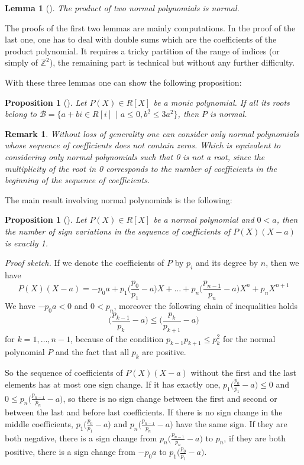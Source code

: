 \documentclass[11pt, a4paper]{article}
\newtheorem{lemma}[mtheorem]{Lemma}
\newtheorem{remark}[mtheorem]{Remark}
\newtheorem{proposition}[mtheorem]{Proposition}
\newcommand{\ssb}{{\mathcal B}}
\newcommand{\zz}{{\mathbb Z}}
\begin{document}
\begin{lemma}[\cite{bpr}]
The product of two  normal polynomials is normal.
\label{lemma243}
\end{lemma}

The proofs of the first two lemmas are mainly computations. In the proof of the last one, one has to deal with double sums which are the coefficients of the product polynomial. It requires a tricky partition of the range of indices (or simply of $\zz^2$), the remaining part is technical but without any further difficulty.

With these three lemmas one can show the following proposition:

\begin{proposition}[\cite{bpr}]
Let $P(X) \in R[X]$ be a monic polynomial. If all its roots belong to $\ssb= \{a +bi \in R[i] \phantom{i} | \phantom{i} a \leq 0, b^2 \leq 3a^2 \}$, then $P$ is normal.
\label{prop240}
\end{proposition}

\begin{remark}
Without loss of generality one can consider only normal polynomials whose sequence of coefficients does not contain zeros. Which is equivalent to considering only normal polynomials such that 0 is not a root, since the multiplicity of the root in 0 corresponds to the number of coefficients in the beginning of the sequence of coefficients.
\label{remarkno0}
\end{remark}
The main result involving normal polynomials is the following:

\begin{proposition}[\cite{bpr}]
Let $P(X) \in R[X]$ be a normal polynomial and $0 < a$, then the number of sign variations in the sequence  of coefficients of $P(X)(X-a)$ is exactly 1.
\label{prop244}
\end{proposition}

\textit{Proof sketch.}
If we denote the coefficients of $P$ by $p_i$ and its degree by $n$, then we have
\[P(X)(X-a) =  -p_0a +p_1 \biggl(\frac{p_0}{p_1} - a \biggr) X + \ldots + p_n \biggl(\frac{p_{n-1}}{p_n} - a \biggr) X^n + p_n X^{n+1}\]
We have $-p_0a < 0$ and $0 < p_n$, moreover the following chain of inequalities holds
\[\biggl( \frac{p_{k-1}}{p_k} - a\biggr) \leq \biggl( \frac{p_{k}}{p_{k+1}} - a\biggr)\]
for $k=1,\ldots,n-1$, because of the condition $p_{k-1} p_{k+1} \leq p_k^2$ for the normal polynomial $P$ and the fact that all $p_k$ are positive.

So the sequence of coefficients of $P(X)(X-a)$ without the first and the last elements has at most one sign change. If it has exactly one, $p_1 \bigl(\frac{p_0}{p_1} - a \bigr) \leq 0$ and $0 \leq p_n \bigl(\frac{p_{n-1}}{p_n} - a \bigr)$, so there is no sign change between the first and second or between the last and before last coefficients. If there is no sign change in the middle coefficients, $p_1 \bigl(\frac{p_0}{p_1} - a \bigr)$ and $p_n \bigl(\frac{p_{n-1}}{p_n} - a \bigr)$ have the same sign. If they are both negative, there is a sign change from $p_n \bigl(\frac{p_{n-1}}{p_n} - a \bigr)$ to $p_n$, if they are both positive, there is a sign change from $-p_0 a$ to $p_1 \bigl(\frac{p_0}{p_1} - a \bigr)$.
\end{document}

